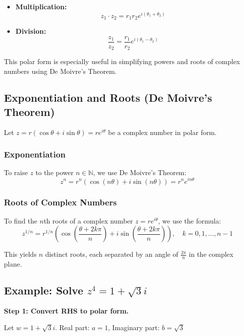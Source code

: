 \begin{itemize}[label=\(-\)]
	\item \textbf{Multiplication:}
	      \[
		      z_1 \cdot z_2 = r_1 r_2 e^{i(\theta_1 + \theta_2)}
	      \]

	\item \textbf{Division:}
	      \[
		      \frac{z_1}{z_2} = \frac{r_1}{r_2} e^{i(\theta_1 - \theta_2)}
	      \]
\end{itemize}

This polar form is especially useful in simplifying powers and roots of complex numbers using De Moivre’s Theorem.

\subsection{Exponentiation and Roots (De Moivre's Theorem)}

Let \( z = r(\cos \theta + i \sin \theta) = re^{i\theta} \) be a complex number in polar form.

\subsubsection{Exponentiation}

To raise \( z \) to the power \( n \in \mathbb{N} \), we use De Moivre’s Theorem:
\[
	z^n = r^n (\cos(n\theta) + i \sin(n\theta)) = r^n e^{in\theta}
\]

\subsubsection{Roots of Complex Numbers}

To find the \( n \)th roots of a complex number \( z = r e^{i\theta} \), we use the formula:
\[
	z^{1/n} = r^{1/n} \left( \cos\left( \frac{\theta + 2k\pi}{n} \right) + i \sin\left( \frac{\theta + 2k\pi}{n} \right) \right), \quad k = 0, 1, \ldots, n-1
\]

This yields \( n \) distinct roots, each separated by an angle of \( \frac{2\pi}{n} \) in the complex plane.

\subsection{Example: Solve \texorpdfstring{\( z^4 = 1 + \sqrt{3}i \)}{}}

\textbf{Step 1: Convert RHS to polar form.}

Let \( w = 1 + \sqrt{3}i \).
Real part: \( a = 1 \), Imaginary part: \( b = \sqrt{3} \)

